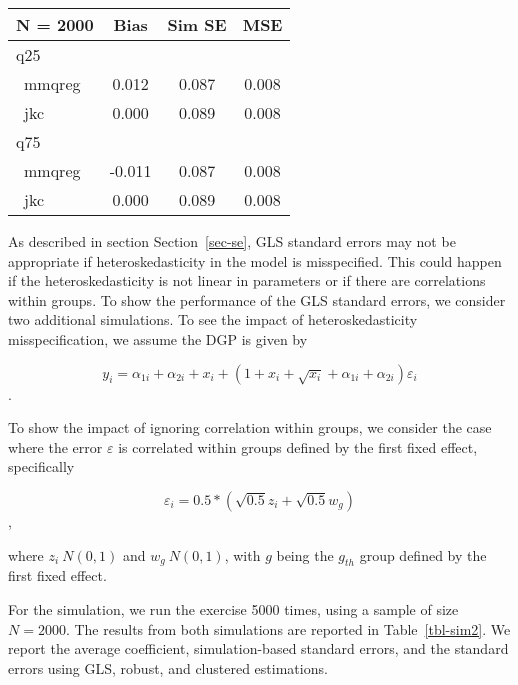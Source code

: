 \documentclass[
  authoryear,
  review,
  1p]{elsarticle}
\begin{document}
\begin{table}
\begin{minipage}[t]{0.50\linewidth}
{}

\end{minipage}%
%
\begin{minipage}[t]{0.50\linewidth}

{\centering 

\begin{longtable}[]{@{}lccc@{}}
\toprule\noalign{}
N = 2000 & Bias & Sim SE & MSE \\
\midrule\noalign{}
\endhead
\bottomrule\noalign{}
\endlastfoot
q25 & & & \\
~mmqreg & 0.012 & 0.087 & 0.008 \\
~jkc & 0.000 & 0.089 & 0.008 \\
q75 & & & \\
~mmqreg & -0.011 & 0.087 & 0.008 \\
~jkc & 0.000 & 0.089 & 0.008 \\
\end{longtable}

}

\end{minipage}%

\end{table}

As described in section Section~\ref{sec-se}, GLS standard errors may
not be appropriate if heteroskedasticity in the model is misspecified.
This could happen if the heteroskedasticity is not linear in parameters
or if there are correlations within groups. To show the performance of
the GLS standard errors, we consider two additional simulations. To see
the impact of heteroskedasticity misspecification, we assume the DGP is
given by

\[y_i = \alpha_{1i} + \alpha_{2i} + x_i + (1+x_i + \sqrt{x_i} +\alpha_{1i} + \alpha_{2i} ) \varepsilon_i
\].

To show the impact of ignoring correlation within groups, we consider
the case where the error \(\varepsilon\) is correlated within groups
defined by the first fixed effect, specifically

\[\varepsilon_i =0.5*(\sqrt{0.5} z_i + \sqrt{0.5} w_g)\],

where \(z_i~N(0,1)\) and \(w_g~N(0,1)\), with \(g\) being the \(g_{th}\)
group defined by the first fixed effect.

For the simulation, we run the exercise 5000 times, using a sample of
size \(N=2000\). The results from both simulations are reported in 
Table~\ref{tbl-sim2}. We report the average coefficient, simulation-based standard errors, and the standard errors using GLS, robust, and
clustered estimations.
\end{document}

